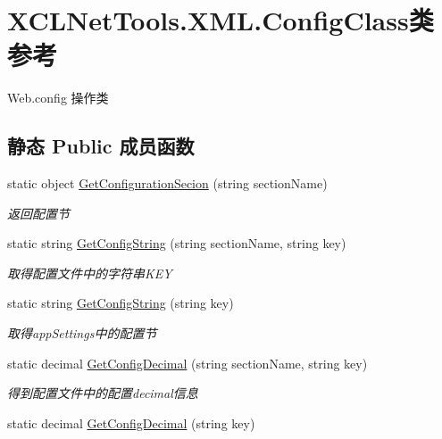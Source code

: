 \hypertarget{class_x_c_l_net_tools_1_1_x_m_l_1_1_config_class}{\section{X\-C\-L\-Net\-Tools.\-X\-M\-L.\-Config\-Class类 参考}
\label{class_x_c_l_net_tools_1_1_x_m_l_1_1_config_class}
}


Web.\-config 操作类  


\subsection*{静态 Public 成员函数}
\begin{DoxyCompactItemize}
\item 
static object \hyperlink{class_x_c_l_net_tools_1_1_x_m_l_1_1_config_class_aaad0da3f0f225afe8f90fef3601e952a}{Get\-Configuration\-Secion} (string section\-Name)
\begin{DoxyCompactList}\small\item\em 返回配置节 \end{DoxyCompactList}\item 
static string \hyperlink{class_x_c_l_net_tools_1_1_x_m_l_1_1_config_class_a253cc7b4b74bea0a5a6843ef23b58165}{Get\-Config\-String} (string section\-Name, string key)
\begin{DoxyCompactList}\small\item\em 取得配置文件中的字符串\-K\-E\-Y \end{DoxyCompactList}\item 
static string \hyperlink{class_x_c_l_net_tools_1_1_x_m_l_1_1_config_class_aceec5701515f9c2fdddcdc1c819b4dc3}{Get\-Config\-String} (string key)
\begin{DoxyCompactList}\small\item\em 取得app\-Settings中的配置节 \end{DoxyCompactList}\item 
static decimal \hyperlink{class_x_c_l_net_tools_1_1_x_m_l_1_1_config_class_a508cd35e095d82d3605ec9188e6145cc}{Get\-Config\-Decimal} (string section\-Name, string key)
\begin{DoxyCompactList}\small\item\em 得到配置文件中的配置decimal信息 \end{DoxyCompactList}\item 
static decimal \hyperlink{class_x_c_l_net_tools_1_1_x_m_l_1_1_config_class_ae80b8dff596de60fc8f7c1f6376ddb4b}{Get\-Config\-Decimal} (string key)

\end{DoxyCompactItemize}
